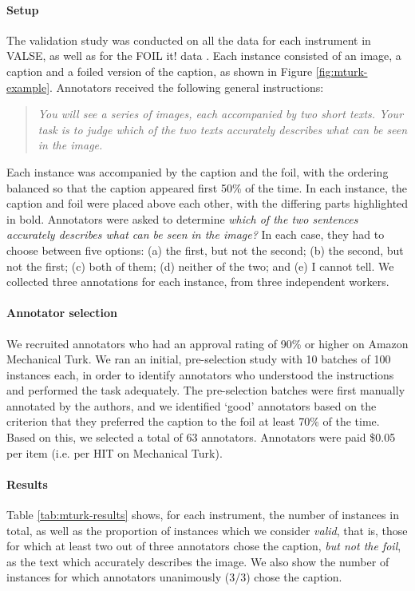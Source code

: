 \documentclass[11pt]{article}
\newcommand{\dataset}{VALSE}
\begin{document}
\paragraph{Setup} 
The validation study was conducted on all the data for each instrument in \dataset{}, as well as for the FOIL it! data \cite{shekhar-etal-2019-beyond}. Each instance consisted of an image, a caption and a foiled version of the caption, as shown in Figure \ref{fig:mturk-example}. Annotators received the following general instructions:

\begin{quote}
    \emph{
    You will see a series of images, each accompanied by two short texts. Your task is to judge which of the two texts accurately describes what can be seen in the image. }
\end{quote}

Each instance was accompanied by the caption and the foil, with the ordering balanced so that the caption appeared first 50\% of the time. In each instance, the caption and foil were placed above each other, with the differing parts highlighted in bold. Annotators were asked to determine {\em which of the two sentences accurately describes what can be seen in the image?} In each case, they had to choose between five options: (a) the first, but not the second; (b) the second, but not the first; (c) both of them; (d) neither of the two; and (e) I cannot tell. We collected three annotations for each instance, from three independent workers. 

\paragraph{Annotator selection} We recruited annotators who had an approval rating of 90\% or higher on Amazon Mechanical Turk. We ran an initial, pre-selection study with 10 batches of 100 instances each, in order to identify annotators who understood the instructions and performed the task adequately. The pre-selection batches were first manually annotated by the authors, and we identified `good' annotators based on the criterion that they preferred the caption to the foil at least 70\% of the time. Based on this, we selected a total of 63 annotators. Annotators were paid \$0.05 per item (i.e. per HIT on Mechanical Turk).

\paragraph{Results}
Table \ref{tab:mturk-results} shows, for each instrument, the number of instances in total, as well as the proportion of instances which we consider {\em valid}, that is, those for which at least two out of three annotators chose the caption, {\em but not the foil}, as the text which accurately describes the image. We also show the number of instances for which annotators unanimously (3/3) chose the caption.
\end{document}
